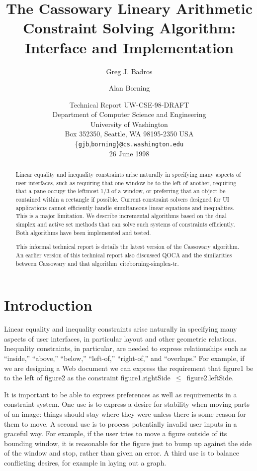 \documentclass{article}
\title{The Cassowary Lineary Arithmetic Constraint Solving Algorithm:
  Interface and Implementation}
\author{Greg J. Badros \and Alan Borning}
\date{Technical Report UW-CSE-98-DRAFT \\
Department of Computer Science and Engineering \\
University of Washington \\
Box 352350, Seattle, WA  98195-2350  USA \\
{\small \{{\tt gjb},{\tt borning}\}{\tt @cs.washington.edu}} \\
26 June 1998}
\newcommand{\code}{\small\sf}
\begin{document}
\maketitle

\begin{abstract}
Linear equality and inequality constraints arise naturally in specifying
many aspects of user interfaces, such as requiring that one window be to
the left of another, requiring that a pane occupy the leftmost 1/3 of a
window, or preferring that an object be contained within a rectangle if
possible.  Current constraint solvers designed for UI applications cannot
efficiently handle simultaneous linear equations and inequalities.  This is
a major limitation.  We describe incremental algorithms based on the dual
simplex and active set methods that can solve such systems of constraints
efficiently.  Both algorithms have been implemented and tested.

This informal technical report is details the latest version of the
Cassowary algorithm.  An earlier version of this technical report also
discussed QOCA and the similarities between Cassowary and that
algorithm~cite{borning-simplex-tr}.
\end{abstract}


\bigskip

\section{Introduction}

Linear equality and inequality constraints arise naturally in specifying
many aspects of user interfaces, in particular layout and other geometric
relations.  Inequality constraints, in particular, are needed to express
relationships such as ``inside,'' ``above,'' ``below,'' ``left-of,''
``right-of,'' and ``overlaps.''  For example, if we are designing a
Web document we can express the
requirement that {\code figure1} be to the left of {\code figure2} as the
constraint \mbox{\code figure1.rightSide $\leq$ figure2.leftSide}.

It is important to be able to express preferences as well as requirements
in a constraint system.  One use is to express a desire for stability
when moving parts of an image: things should stay where they were unless
there is some reason for them to move.  A second use is to process
potentially invalid user inputs in a graceful way.  For example, if the
user tries to move a figure outside of its bounding window, it is
reasonable for the figure just to bump up against the side of the window
and stop, rather than given an error.  A
third use is to balance conflicting desires, for example in laying out a
graph.
\end{document}
